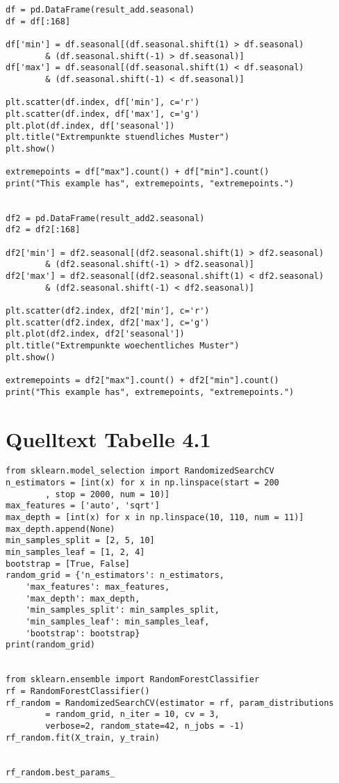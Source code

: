 \begin{lstlisting}[caption={\texttt{Quelltext Abbildung 4.6}},captionpos=b]
df = pd.DataFrame(result_add.seasonal)
df = df[:168]

df['min'] = df.seasonal[(df.seasonal.shift(1) > df.seasonal) 
		& (df.seasonal.shift(-1) > df.seasonal)]
df['max'] = df.seasonal[(df.seasonal.shift(1) < df.seasonal) 
		& (df.seasonal.shift(-1) < df.seasonal)]

plt.scatter(df.index, df['min'], c='r')
plt.scatter(df.index, df['max'], c='g')
plt.plot(df.index, df['seasonal'])
plt.title("Extrempunkte stuendliches Muster")
plt.show()

extremepoints = df["max"].count() + df["min"].count()
print("This example has", extremepoints, "extremepoints.")


df2 = pd.DataFrame(result_add2.seasonal)
df2 = df2[:168]

df2['min'] = df2.seasonal[(df2.seasonal.shift(1) > df2.seasonal) 
		& (df2.seasonal.shift(-1) > df2.seasonal)]
df2['max'] = df2.seasonal[(df2.seasonal.shift(1) < df2.seasonal) 
		& (df2.seasonal.shift(-1) < df2.seasonal)]

plt.scatter(df2.index, df2['min'], c='r')
plt.scatter(df2.index, df2['max'], c='g')
plt.plot(df2.index, df2['seasonal'])
plt.title("Extrempunkte woechentliches Muster")
plt.show()

extremepoints = df2["max"].count() + df2["min"].count()
print("This example has", extremepoints, "extremepoints.")
\end{lstlisting}

\section{Quelltext Tabelle 4.1}

\begin{lstlisting}[caption={\texttt{Quelltext Tabelle 4.1}},captionpos=b]
from sklearn.model_selection import RandomizedSearchCV
n_estimators = [int(x) for x in np.linspace(start = 200
		, stop = 2000, num = 10)]
max_features = ['auto', 'sqrt']
max_depth = [int(x) for x in np.linspace(10, 110, num = 11)]
max_depth.append(None)
min_samples_split = [2, 5, 10]
min_samples_leaf = [1, 2, 4]
bootstrap = [True, False]
random_grid = {'n_estimators': n_estimators,
	'max_features': max_features,
	'max_depth': max_depth,
	'min_samples_split': min_samples_split,
	'min_samples_leaf': min_samples_leaf,
	'bootstrap': bootstrap}
print(random_grid)


from sklearn.ensemble import RandomForestClassifier
rf = RandomForestClassifier()
rf_random = RandomizedSearchCV(estimator = rf, param_distributions 
		= random_grid, n_iter = 10, cv = 3, 
		verbose=2, random_state=42, n_jobs = -1)
rf_random.fit(X_train, y_train)


rf_random.best_params_
\end{lstlisting}

